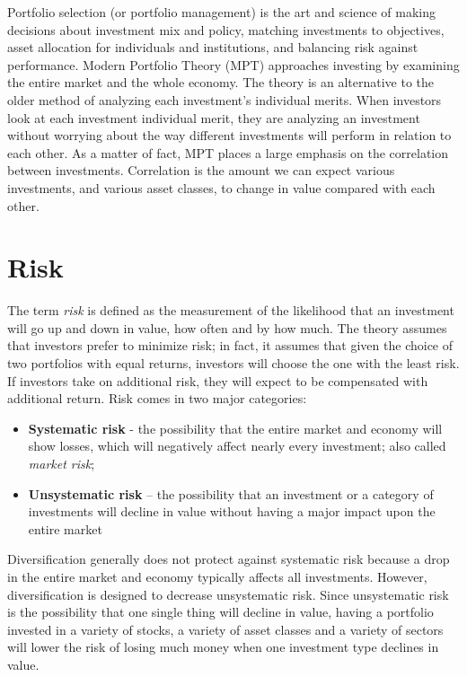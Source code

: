 Portfolio selection (or portfolio management) is the art and science of making decisions about investment mix and policy, matching investments to objectives, asset allocation for individuals and institutions, and balancing risk against performance. Modern Portfolio Theory (MPT) approaches investing by examining the entire market and the whole economy. The theory is an alternative to the older method of analyzing each investment’s individual merits. When investors look at each investment individual merit, they are analyzing an investment without worrying about the way different investments will perform in relation to each other. As a matter of fact, MPT places a large emphasis on the correlation between investments. Correlation is the amount we can expect various investments, and various asset classes, to change in value compared with each other. 

\section{Risk}
The term \textit{risk} is defined as the measurement of the likelihood that an investment will go up and down in value, how often and by how much. The theory assumes that investors prefer to minimize risk; in fact, it assumes that given the choice of two portfolios with equal returns, investors will choose the one with the least risk. If investors take on additional risk, they will expect to be compensated with additional return. Risk comes in two major categories:
\begin{itemize}
\item \textbf{Systematic risk} - the possibility that the entire market and economy will show losses, which will negatively affect nearly every investment; also called \textit{market risk};
\item \textbf{Unsystematic risk} – the possibility that an investment or a category of investments will decline in value without having a major impact upon the entire market
\end{itemize}
Diversification generally does not protect against systematic risk because a drop in the entire market and economy typically affects all investments. However, diversification is designed to decrease unsystematic risk. Since unsystematic risk is the possibility that one single thing will decline in value, having a portfolio invested in a variety of stocks, a variety of asset classes and a variety of sectors will lower the risk of losing much money when one investment type declines in value.

